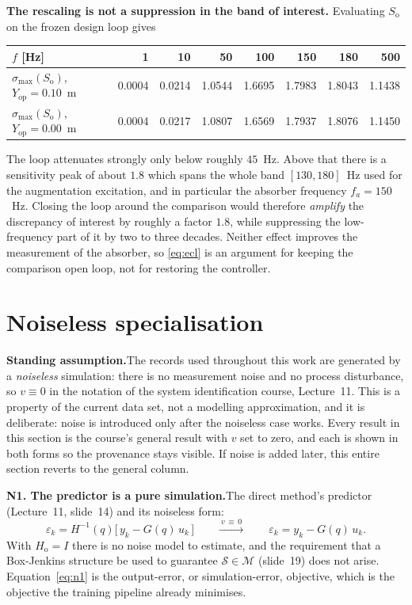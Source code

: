 \documentclass[11pt]{article}
\newcommand{\So}{S_{\mathrm{o}}}
\begin{document}
\medskip\noindent\textbf{The rescaling is not a suppression in the band of interest.} Evaluating
$\So$ on the frozen design loop gives

\begin{center}
\begin{tabular}{lrrrrrrr}
\toprule
$f$ [Hz] & 1 & 10 & 50 & 100 & 150 & 180 & 500 \\
\midrule
$\sigma_{\max}(\So)$, $Y_{\mathrm{op}} = 0.10$~m & 0.0004 & 0.0214 & 1.0544 & 1.6695 & 1.7983 & 1.8043 & 1.1438 \\
$\sigma_{\max}(\So)$, $Y_{\mathrm{op}} = 0.00$~m & 0.0004 & 0.0217 & 1.0807 & 1.6569 & 1.7937 & 1.8076 & 1.1450 \\
\bottomrule
\end{tabular}
\end{center}

\noindent The loop attenuates strongly only below roughly $45$~Hz. Above that there is a
sensitivity peak of about $1.8$ which spans the whole band $[130,180]$~Hz used for the
augmentation excitation, and in particular the absorber frequency $f_a = 150$~Hz. Closing the
loop around the comparison would therefore \emph{amplify} the discrepancy of interest by roughly
a factor $1.8$, while suppressing the low-frequency part of it by two to three decades. Neither
effect improves the measurement of the absorber, so \eqref{eq:ecl} is an argument for keeping the
comparison open loop, not for restoring the controller.

\section{Noiseless specialisation}
\label{sec:noiseless}

\noindent\textbf{Standing assumption.}\quad The records used throughout this work are generated by
a \emph{noiseless} simulation: there is no measurement noise and no process disturbance, so
$v \equiv 0$ in the notation of the system identification course, Lecture~11. This is a property of
the current data set, not a modelling approximation, and it is deliberate: noise is introduced only
after the noiseless case works. Every result in this section is the course's general result with
$v$ set to zero, and each is shown in both forms so the provenance stays visible. If noise is added
later, this entire section reverts to the general column.

\medskip\noindent\textbf{N1. The predictor is a pure simulation.}\quad The direct method's predictor
(Lecture~11, slide~14) and its noiseless form:
\begin{equation}
  \varepsilon_k = H^{-1}(q)\big[\,y_k - G(q)\,u_k\,\big]
  \qquad\xrightarrow{\ v\,\equiv\,0\ }\qquad
  \varepsilon_k = y_k - G(q)\,u_k .
  \label{eq:n1}
\end{equation}
With $H_{\mathrm{o}} = I$ there is no noise model to estimate, and the requirement that a
Box-Jenkins structure be used to guarantee $\mathcal{S} \in \mathcal{M}$ (slide~19) does not arise.
Equation~\eqref{eq:n1} is the output-error, or simulation-error, objective, which is the objective
the training pipeline already minimises.
\end{document}

